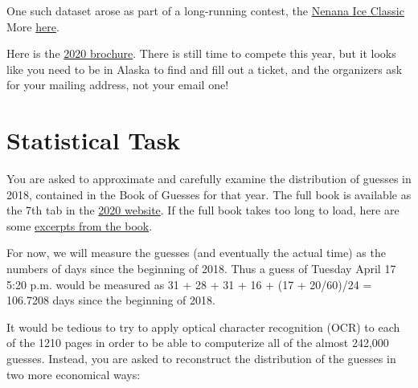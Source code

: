\documentclass[]{book}
\begin{document}
One such dataset arose as part of a long-running contest, the \href{http://www.nenanaakiceclassic.com}{Nenana Ice Classic}
More \href{http://www.john-daly.com/nenana.htm}{here}.

Here is the \href{http://www.medicine.mcgill.ca/epidemiology/hanley/bios691/Nenana2020Brochure.pdf}{2020 brochure}. There is still time to compete this year, but it looks like you need to be in Alaska to find and fill out a ticket, and the organizers ask for your mailing address, not your email one!

\hypertarget{statistical-task}{%
\section{Statistical Task}\label{statistical-task}}

You are asked to approximate and carefully examine the distribution of guesses in 2018, contained in the Book of Guesses for that year. The full book is available as the 7th tab in the \href{http://www.nenanaakiceclassic.com}{2020 website}. If the full book takes too long to load, here are some
\href{http://www.medicine.mcgill.ca/epidemiology/hanley/bios691/SampledPages.pdf}{excerpts from the book}.

For now, we will measure the guesses (and eventually the actual time) as the numbers of days since the beginning of 2018. Thus a guess of Tuesday April 17 5:20 p.m. would be measured as 31 + 28 + 31 + 16 + (17 + 20/60)/24 = 106.7208 days since the beginning of 2018.

It would be tedious to try to apply optical character recognition (OCR) to each of the 1210 pages in order to be able to computerize all of the almost 242,000 guesses. Instead, you are asked to reconstruct the distribution of the guesses in two more economical ways:
\end{document}
